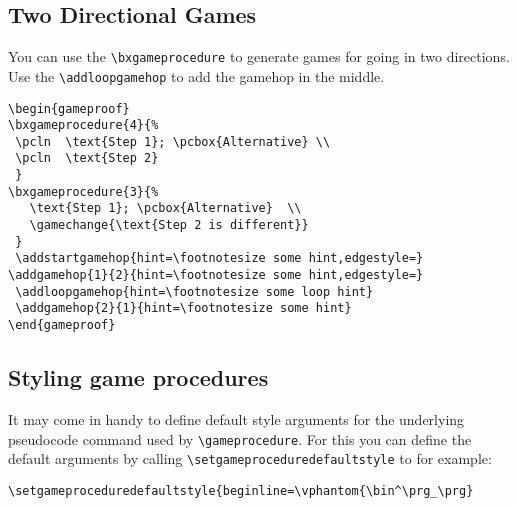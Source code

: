 \documentclass[a4paper]{report}
\begin{document}
\subsection{Two Directional Games}
You can use the \lstinline$\bxgameprocedure$ to generate games for going in two directions. Use the \lstinline$\addloopgamehop$
to add the gamehop in the middle.

\vspace{1cm}
\begin{center}
\begin{gameproof}
\end{gameproof}
\end{center}


\begin{lstlisting}
\begin{gameproof}
\bxgameprocedure{4}{%
 \pcln  \text{Step 1}; \pcbox{Alternative} \\
 \pcln  \text{Step 2}
 }
\bxgameprocedure{3}{%
   \text{Step 1}; \pcbox{Alternative}  \\
   \gamechange{\text{Step 2 is different}}
 }
 \addstartgamehop{hint=\footnotesize some hint,edgestyle=}
\addgamehop{1}{2}{hint=\footnotesize some hint,edgestyle=}
 \addloopgamehop{hint=\footnotesize some loop hint}
 \addgamehop{2}{1}{hint=\footnotesize some hint}
\end{gameproof}
\end{lstlisting}

\subsection{Styling game procedures}
It may come in handy to define default style arguments for the underlying pseudocode
command used by \lstinline$\gameprocedure$. For this you can
define the default arguments by calling \lstinline{\setgameproceduredefaultstyle} to
for example:

\begin{lstlisting}
\setgameproceduredefaultstyle{beginline=\vphantom{\bin^\prg_\prg}
\end{lstlisting}
\end{document}
